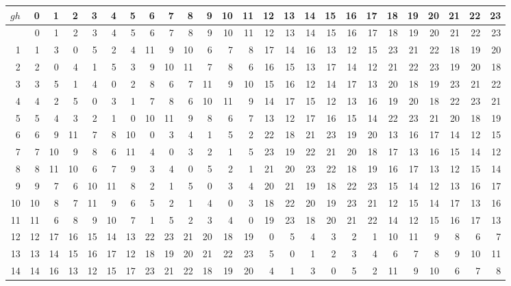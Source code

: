 \documentclass[10pt,a4paper]{article}
\numberwithin{equation}{section}
\begin{document}
{\normalsize\setlength{\tabcolsep}{0.1em}\setlength{\LTleft}{-8pt plus 1fill}\setlength{\LTright}{-8pt plus 1fill}\begin{longtable}{@{}r|rrrrrrrrrrrrrrrrrrrrrrrr@{}}\toprule
$gh$ & 0 & 1 & 2 & 3 & 4 & 5 & 6 & 7 & 8 & 9 & 10 & 11 & 12 & 13 & 14 & 15 & 16 & 17 & 18 & 19 & 20 & 21 & 22 & 23\\\midrule\endhead
\bottomrule\endfoot\endlastfoot
0 & 0 & 1 & 2 & 3 & 4 & 5 & 6 & 7 & 8 & 9 & 10 & 11 & 12 & 13 & 14 & 15 & 16 & 17 & 18 & 19 & 20 & 21 & 22 & 23\\*
1 & 1 & 3 & 0 & 5 & 2 & 4 & 11 & 9 & 10 & 6 & 7 & 8 & 17 & 14 & 16 & 13 & 12 & 15 & 23 & 21 & 22 & 18 & 19 & 20\\
2 & 2 & 0 & 4 & 1 & 5 & 3 & 9 & 10 & 11 & 7 & 8 & 6 & 16 & 15 & 13 & 17 & 14 & 12 & 21 & 22 & 23 & 19 & 20 & 18\\
3 & 3 & 5 & 1 & 4 & 0 & 2 & 8 & 6 & 7 & 11 & 9 & 10 & 15 & 16 & 12 & 14 & 17 & 13 & 20 & 18 & 19 & 23 & 21 & 22\\
4 & 4 & 2 & 5 & 0 & 3 & 1 & 7 & 8 & 6 & 10 & 11 & 9 & 14 & 17 & 15 & 12 & 13 & 16 & 19 & 20 & 18 & 22 & 23 & 21\\
5 & 5 & 4 & 3 & 2 & 1 & 0 & 10 & 11 & 9 & 8 & 6 & 7 & 13 & 12 & 17 & 16 & 15 & 14 & 22 & 23 & 21 & 20 & 18 & 19\\
6 & 6 & 9 & 11 & 7 & 8 & 10 & 0 & 3 & 4 & 1 & 5 & 2 & 22 & 18 & 21 & 23 & 19 & 20 & 13 & 16 & 17 & 14 & 12 & 15\\
7 & 7 & 10 & 9 & 8 & 6 & 11 & 4 & 0 & 3 & 2 & 1 & 5 & 23 & 19 & 22 & 21 & 20 & 18 & 17 & 13 & 16 & 15 & 14 & 12\\
8 & 8 & 11 & 10 & 6 & 7 & 9 & 3 & 4 & 0 & 5 & 2 & 1 & 21 & 20 & 23 & 22 & 18 & 19 & 16 & 17 & 13 & 12 & 15 & 14\\
9 & 9 & 7 & 6 & 10 & 11 & 8 & 2 & 1 & 5 & 0 & 3 & 4 & 20 & 21 & 19 & 18 & 22 & 23 & 15 & 14 & 12 & 13 & 16 & 17\\
10 & 10 & 8 & 7 & 11 & 9 & 6 & 5 & 2 & 1 & 4 & 0 & 3 & 18 & 22 & 20 & 19 & 23 & 21 & 12 & 15 & 14 & 17 & 13 & 16\\
11 & 11 & 6 & 8 & 9 & 10 & 7 & 1 & 5 & 2 & 3 & 4 & 0 & 19 & 23 & 18 & 20 & 21 & 22 & 14 & 12 & 15 & 16 & 17 & 13\\
12 & 12 & 17 & 16 & 15 & 14 & 13 & 22 & 23 & 21 & 20 & 18 & 19 & 0 & 5 & 4 & 3 & 2 & 1 & 10 & 11 & 9 & 8 & 6 & 7\\
13 & 13 & 14 & 15 & 16 & 17 & 12 & 18 & 19 & 20 & 21 & 22 & 23 & 5 & 0 & 1 & 2 & 3 & 4 & 6 & 7 & 8 & 9 & 10 & 11\\
14 & 14 & 16 & 13 & 12 & 15 & 17 & 23 & 21 & 22 & 18 & 19 & 20 & 4 & 1 & 3 & 0 & 5 & 2 & 11 & 9 & 10 & 6 & 7 & 8\\

\end{longtable}}
\end{document}
